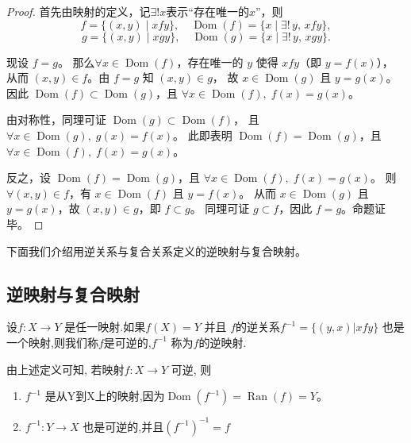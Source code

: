\begin{proof}
	首先由映射的定义，记$\exists ! x$表示“存在唯一的$x$”，则
	\[
	f = \{(x, y) \mid xfy\},\quad
	\operatorname{Dom}(f) = \{x \mid \exists!\, y,\, xfy\},
	\]
	\[
	g = \{(x, y) \mid xgy\},\quad
	\operatorname{Dom}(g) = \{x \mid \exists!\, y,\, xgy\}.
	\]
	
	现设 \(f = g\)。
	那么\(\forall x \in \operatorname{Dom}(f)\)，存在唯一的 \(y\) 使得 \(xfy\)（即 \(y = f(x)\)），
	从而 \((x, y) \in f\)。由 \(f=g\) 知 \((x, y) \in g\)，
	故 \(x \in \operatorname{Dom}(g)\) 且 \(y = g(x)\)。
	因此 \(\operatorname{Dom}(f) \subset \operatorname{Dom}(g)\)，且 \(\forall x \in \operatorname{Dom}(f),\; f(x) = g(x)\)。
	
	由对称性，同理可证 \(\operatorname{Dom}(g) \subset \operatorname{Dom}(f)\)，
	且 \(\forall x \in \operatorname{Dom}(g),\; g(x) = f(x)\)。
	此即表明 \(\operatorname{Dom}(f) = \operatorname{Dom}(g)\)，且 \(\forall x \in \operatorname{Dom}(f),\; f(x) = g(x)\)。
	
	反之，设 \(\operatorname{Dom}(f) = \operatorname{Dom}(g)\)，且 \(\forall x \in \operatorname{Dom}(f),\; f(x) = g(x)\)。
	则 \(\forall (x, y) \in f\)，有 \(x \in \operatorname{Dom}(f)\) 且 \(y = f(x)\)。
	从而 \(x \in \operatorname{Dom}(g)\) 且 \(y = g(x)\)，故 \((x, y) \in g\)，即 \(f \subset g\)。
	同理可证 \(g \subset f\)，因此 \(f = g\)。命题证毕。
\end{proof}

下面我们介绍用逆关系与复合关系定义的逆映射与复合映射。

\subsection{逆映射与复合映射}

\begin{mydef*}{}

设\(f: X \rightarrow Y\) 是任一映射.如果$f(X) = Y$ 并且 $f$的逆关系\(f^{-1} = \{(y, x) | xfy\}\) 也是一个映射,则我们称$f$是可逆的,\(f^{-1}\) 称为$f$的逆映射.

\end{mydef*}

由上述定义可知, 若映射\(f:X\to Y\) 可逆, 则

\begin{enumerate}[label=\arabic*)]
	\item \(f^{-1}\) 是从Y到X上的映射,因为\(\operatorname{Dom}(f^{-1}) = \operatorname{Ran}(f) = Y\)。
	\item \(f^{-1}:Y\to X\) 也是可逆的,并且\((f^{-1})^{-1}=f\)
\end{enumerate}




